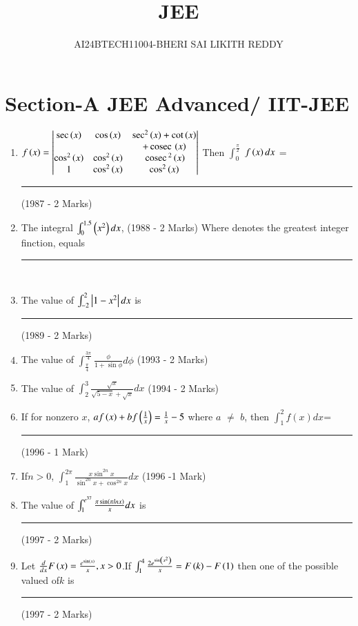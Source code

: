 \documentclass[journal]{IEEEtran}
\begin{document}


\title{JEE}
\author{AI24BTECH11004-BHERI SAI LIKITH REDDY}
\maketitle
\newpage
\bigskip

\renewcommand{\thefigure}{\theenumi}
\renewcommand{\thetable}{\theenumi}

\section{Section-A JEE Advanced/ IIT-JEE}
\begin{enumerate}
	\item
			$f\left(x\right) = \begin{vmatrix}
			\sec\left(x\right) & \cos\left(x\right) &\sec^2\left(x\right)+\cot\left(x\right)\\
			 & &+\,\text{cosec}\, \left(x\right)\\
		\cos^2\left(x\right) & \cos^2\left(x\right) & \,\text{cosec}\,^2\left(x\right)\\
	1 & \cos^2\left(x\right) & \cos^2\left(x\right)\end{vmatrix}$
	Then $\int_0^{\frac{\pi}{2}}$ $f\left(x\right)dx$ = \rule{1cm}{0.15mm}
\hfill{(1987 - 2 Marks)} 
		
\item The integral $\int_0^{1.5} \left(x^2\right)dx$,
\hfill{(1988 - 2 Marks)}
	Where \sbrak denotes the greatest integer finction, equals \rule{1cm}{0.15mm}  \\
		
\item The value of  $\int_{-2}^2 \left\vert1-x^2\right\vert dx$ is \rule{1cm}{0.15mm}
	\hfill{(1989 - 2 Marks)}
		
\item The value of $\int_{\frac{\pi}{4}}^{\frac{3\pi}{4}} \frac{\phi}{1+ \sin \phi} d\phi$
\hfill{(1993 - 2 Marks)}
		
\item The value of $\int_2^3 \frac{\sqrt x }{\sqrt {5-x}+\sqrt {x}} dx$
\hfill{(1994 - 2 Marks)}
		
\item If for nonzero $x$, $af\left(x\right)+bf \left(\frac{1}{x} \right) = \frac{1}{x}-5 $ where $a$ 
	$\neq$  $b$, then $\int_1^2f(x)dx$= \rule{1cm}{0.15mm}
\hfill{(1996 - 1 Mark)}
		
\item If$ n>0$, $\int_1^{2\pi} \frac {x \sin ^{2n}x}{\sin^{2n}x+\cos^{2n} x} dx $
\hfill{(1996 -1 Mark)}
		
\item The value of $\int_1^{e^{37}} \frac {\pi \sin \left(\pi lnx\right)}{x} dx$ is \rule{1cm}{0.15mm}

	\hfill{(1997 - 2 Marks)}
		
\item Let $\frac {d}{dx}F\left(x\right)=\frac {e^{\sin\left(x\right)}}{x},x>0$.If $\int_1^4 \frac{2e^{\sin \left(x^2\right)}}{x}=F\left(k\right)-F\left(1\right)$ then one of the possible valued of$ k$ is \rule{1cm}{0.15mm}
\hfill{(1997 - 2 Marks)}\\
\end{enumerate}
\end{document}
